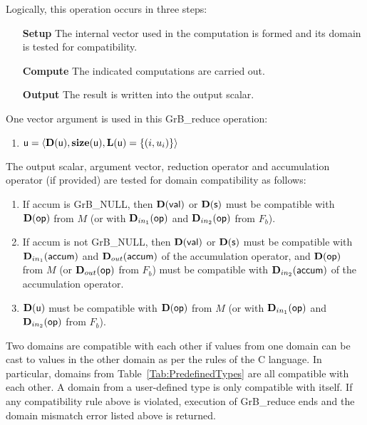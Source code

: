 Logically, this operation occurs in three steps:
\begin{enumerate}[leftmargin=0.85in]
\item[\bf Setup] The internal vector used in the computation is formed 
and its domain is tested for compatibility.
\item[\bf Compute] The indicated computations are carried out.
\item[\bf Output] The result is written into the output scalar.
\end{enumerate}

One vector argument is used in this {\sf GrB\_reduce} operation:
\begin{enumerate}
	\item ${\sf u} = \langle \bold{D}({\sf u}),\bold{size}({\sf u}),
    \bold{L}({\sf u}) = \{(i,u_i) \} \rangle$
\end{enumerate}

The output scalar, argument vector, reduction operator and accumulation 
operator (if provided) are tested for domain compatibility as follows:
\begin{enumerate}

	\item If {\sf accum} is {\sf GrB\_NULL}, then $\bold{D}({\sf val})$ or $\bold{D}({\sf s})$ must be
    compatible with $\bold{D}({\sf op})$ from $M$ {\color{red} (or with $\mbox{$\mathbf{D}_{in_{1}}$}({\sf op})$ and 
    $\mbox{$\mathbf{D}_{in_{2}}$}({\sf op})$ from $F_b$)}.

	\item If {\sf accum} is not {\sf GrB\_NULL}, then $\bold{D}({\sf val})$ or $\bold{D}({\sf s})$ must be
    compatible with $\mbox{$\mathbf{D}_{in_{1}}$}({\sf accum})$ and $\mbox{$\mathbf{D}_{out}$}({\sf accum})$ of the accumulation operator, and 
    $\bold{D}({\sf op})$ from $M$ {\color{red} (or $\mbox{$\mathbf{D}_{out}$}({\sf op})$ from $F_b$)} must be compatible 
    with $\mbox{$\mathbf{D}_{in_{2}}$}({\sf accum})$ of the accumulation operator.

	\item $\bold{D}({\sf u})$ must be compatible with $\bold{D}({\sf op})$ from $M$ {\color{red} 
    (or with $\mbox{$\mathbf{D}_{in_{1}}$}({\sf op})$ and $\mbox{$\mathbf{D}_{in_{2}}$}({\sf op})$ from $F_b$)}.
\end{enumerate}
Two domains are compatible with each other if values from one domain can be cast 
to values in the other domain as per the rules of the C language.
In particular, domains from Table~\ref{Tab:PredefinedTypes} are all compatible 
with each other. A domain from a user-defined type is only compatible with itself.
If any compatibility rule above is violated, execution of {\sf GrB\_reduce} ends and 
the domain mismatch error listed above is returned.

